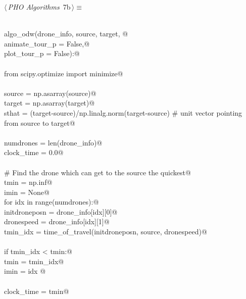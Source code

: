 \documentclass[12.0pt]{report}
\begin{document}
\begin{flushleft} \small\label{scrap3}\raggedright\small
{} $\langle\,${\itshape PHO Algorithms}\nobreak\ {\footnotesize {7b}}$\,\rangle\equiv$
\vspace{-1ex}
\begin{list}{}{} \item
\mbox{}\verb@@\\
\mbox{}\verb@def algo_odw(drone_info, source, target, @\\
\mbox{}\verb@             animate_tour_p = False,@\\
\mbox{}\verb@             plot_tour_p    = False):@\\
\mbox{}\verb@@\\
\mbox{}\verb@    from scipy.optimize import minimize@\\
\mbox{}\verb@@\\
\mbox{}\verb@    source = np.asarray(source)@\\
\mbox{}\verb@    target = np.asarray(target)@\\
\mbox{}\verb@    sthat  = (target-source)/np.linalg.norm(target-source) # unit vector pointing from source to target@\\
\mbox{}\verb@@\\
\mbox{}\verb@    numdrones  = len(drone_info)@\\
\mbox{}\verb@    clock_time = 0.0@\\
\mbox{}\verb@@\\
\mbox{}\verb@    # Find the drone which can get to the source the quickest@\\
\mbox{}\verb@    tmin = np.inf@\\
\mbox{}\verb@    imin = None@\\
\mbox{}\verb@    for idx in range(numdrones):@\\
\mbox{}\verb@         initdroneposn = drone_info[idx][0]@\\
\mbox{}\verb@         dronespeed    = drone_info[idx][1]@\\
\mbox{}\verb@         tmin_idx = time_of_travel(initdroneposn, source, dronespeed)@\\
\mbox{}\verb@@\\
\mbox{}\verb@         if tmin_idx < tmin:@\\
\mbox{}\verb@             tmin = tmin_idx@\\
\mbox{}\verb@             imin = idx @\\
\mbox{}\verb@@\\
\mbox{}\verb@    clock_time = tmin@\\

\end{list}
\end{flushleft}
\end{document}

